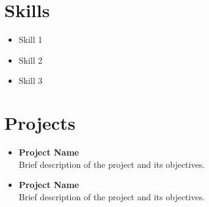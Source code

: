 \documentclass[a4paper,10pt]{article}
\begin{document}
\section*{Skills}
\begin{itemize}
    \item Skill 1
    \item Skill 2
    \item Skill 3
\end{itemize}

\section*{Projects}
\begin{itemize}
    \item \textbf{Project Name} \\
    Brief description of the project and its objectives.
    \item \textbf{Project Name} \\
    Brief description of the project and its objectives.
\end{itemize}
\end{document}
